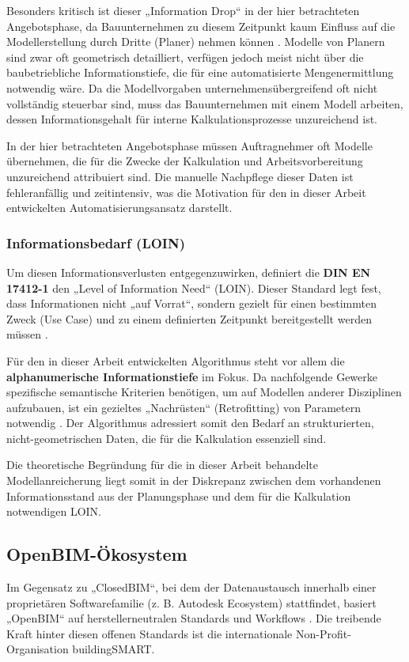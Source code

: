 Besonders kritisch ist dieser „Information Drop“ in der hier betrachteten Angebotsphase, da Bauunternehmen zu diesem Zeitpunkt kaum Einfluss auf die Modellerstellung durch Dritte (Planer) nehmen können \cite{borrmann2015building}. Modelle von Planern sind zwar oft geometrisch detailliert, verfügen jedoch meist nicht über die baubetriebliche Informationstiefe, die für eine automatisierte Mengenermittlung notwendig wäre. Da die Modellvorgaben unternehmensübergreifend oft nicht vollständig steuerbar sind, muss das Bauunternehmen mit einem Modell arbeiten, dessen Informationsgehalt für interne Kalkulationsprozesse unzureichend ist.

In der hier betrachteten Angebotsphase müssen Auftragnehmer oft Modelle übernehmen, die für die Zwecke der Kalkulation und Arbeitsvorbereitung unzureichend attribuiert sind. Die manuelle Nachpflege dieser Daten ist fehleranfällig und zeitintensiv, was die Motivation für den in dieser Arbeit entwickelten Automatisierungsansatz darstellt.

\subsubsection{Informationsbedarf (LOIN)}
Um diesen Informationsverlusten entgegenzuwirken, definiert die \textbf{DIN EN 17412-1} den „Level of Information Need“ (LOIN). Dieser Standard legt fest, dass Informationen nicht „auf Vorrat“, sondern gezielt für einen bestimmten Zweck (Use Case) und zu einem definierten Zeitpunkt bereitgestellt werden müssen \cite{abualdenien2022levels}. 

Für den in dieser Arbeit entwickelten Algorithmus steht vor allem die \textbf{alphanumerische Informationstiefe} im Fokus. Da nachfolgende Gewerke spezifische semantische Kriterien benötigen, um auf Modellen anderer Disziplinen aufzubauen, ist ein gezieltes „Nachrüsten“ (Retrofitting) von Parametern notwendig \cite{abualdenien2022levels}. Der Algorithmus adressiert somit den Bedarf an strukturierten, nicht-geometrischen Daten, die für die Kalkulation essenziell sind.

Die theoretische Begründung für die in dieser Arbeit behandelte Modellanreicherung liegt somit in der Diskrepanz zwischen dem vorhandenen Informationsstand aus der Planungsphase und dem für die Kalkulation notwendigen LOIN.

\subsection{OpenBIM-Ökosystem}
\label{subsec:openbim}
Im Gegensatz zu „ClosedBIM“, bei dem der Datenaustausch innerhalb einer proprietären Softwarefamilie (z. B. Autodesk Ecosystem) stattfindet, basiert „OpenBIM“ auf herstellerneutralen Standards und Workflows \cite{borrmann2015building}. Die treibende Kraft hinter diesen offenen Standards ist die internationale Non-Profit-Organisation buildingSMART.

